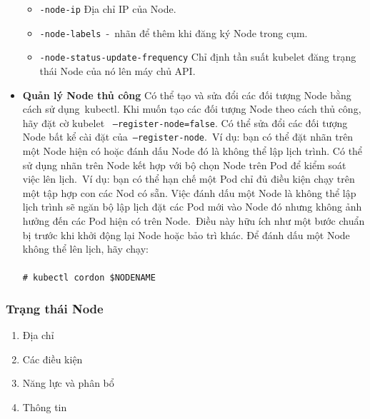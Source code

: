 \documentclass[12pt,a4paper]{report}
\newcommand{\shellcmd}[1]{\\\indent\indent\texttt{\footnotesize\# #1}\\}
\begin{document}
\begin{itemize}
\begin{itemize}
			\item \texttt{-node-ip} Địa chỉ IP của Node.
			\item \texttt{-node-labels} - nhãn để thêm khi đăng ký Node trong cụm.
			\item \texttt{-node-status-update-frequency} Chỉ định tần suất kubelet đăng trạng thái Node của nó lên máy chủ API.
		\end{itemize}
		\smallskip
		\item \textbf{Quản lý Node thủ công}
		\smallskip
		\subitem Có thể tạo và sửa đổi các đối tượng Node bằng cách sử dụng kubectl.
		\smallskip
		\subitem Khi muốn tạo các đối tượng Node theo cách thủ công, hãy đặt cờ kubelet     \texttt{--register-node=false}.
		\smallskip
		\subitem Có thể sửa đổi các đối tượng Node bất kể cài đặt của \texttt{--register-node}. Ví dụ: bạn có thể đặt nhãn trên một Node hiện có hoặc đánh dấu Node đó là không thể lập lịch trình.
		\smallskip
		\subitem Có thể sử dụng nhãn trên Node kết hợp với bộ chọn Node trên Pod để kiểm soát việc lên lịch. Ví dụ: bạn có thể hạn chế một Pod chỉ đủ điều kiện chạy trên một tập hợp con các Nod có sẵn.
		\smallskip
		\subitem Việc đánh dấu một Node là không thể lập lịch trình sẽ ngăn bộ lập lịch đặt các Pod mới vào Node đó nhưng không ảnh hưởng đến các Pod hiện có trên Node. Điều này hữu ích như một bước chuẩn bị trước khi khởi động lại Node hoặc bảo trì khác.
		\subitem Để đánh dấu một Node không thể lên lịch, hãy chạy:\\
		\shellcmd{kubectl cordon \$NODENAME}
	\end{itemize}
	\subsubsection{Trạng thái Node}
	
	\hspace{1cm}{Trạng thái của Node chứa các thông tin sau:}
	\begin{enumerate}
		\item Địa chỉ
		\item Các điều kiện
		\item Năng lực và phân bổ
		\item Thông tin
	\end{enumerate}
	\smallskip
	
\end{document}
